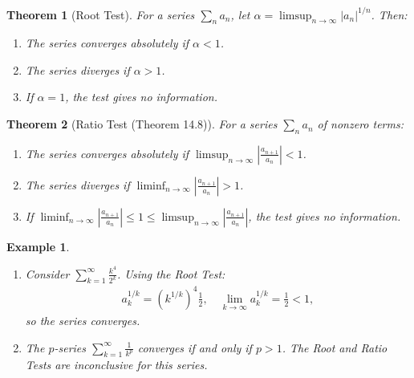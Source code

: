 \documentclass[7pt]{article}
\theoremstyle{definition}
\newtheorem{definition}{Definition}
\theoremstyle{plain}
\newtheorem{theorem}{Theorem}
\newtheorem{example}{Example}
\begin{document}
\begin{theorem}[Root Test]
For a series $ \sum_{n} a_n $, let $ \alpha = \limsup_{n \to \infty} |a_n|^{1/n} $. Then:
\begin{enumerate}
    \item The series converges absolutely if $ \alpha < 1 $.
    \item The series diverges if $ \alpha > 1 $.
    \item If $ \alpha = 1 $, the test gives no information.
\end{enumerate}
\end{theorem}

\begin{theorem}[Ratio Test (Theorem 14.8)]
For a series $ \sum_{n} a_n $ of nonzero terms:
\begin{enumerate}
    \item The series converges absolutely if $ \limsup_{n \to \infty} \left| \frac{a_{n+1}}{a_n} \right| < 1 $.
    \item The series diverges if $ \liminf_{n \to \infty} \left| \frac{a_{n+1}}{a_n} \right| > 1 $.
    \item If $ \liminf_{n \to \infty} \left| \frac{a_{n+1}}{a_n} \right| \leq 1 \leq \limsup_{n \to \infty} \left| \frac{a_{n+1}}{a_n} \right| $, the test gives no information.
\end{enumerate}
\end{theorem}

\begin{example}

\begin{enumerate}
    \item Consider $ \sum_{k=1}^\infty \frac{k^4}{2^k} $. Using the Root Test:
    \begin{align}
    a_k^{1/k} = \left( k^{1/k} \right)^4 \frac{1}{2}, \quad \lim_{k \to \infty} a_k^{1/k} = \frac{1}{2} < 1,
    \end{align}
    so the series converges.
    \item The $ p $-series $ \sum_{k=1}^\infty \frac{1}{k^p} $ converges if and only if $ p > 1 $. The Root and Ratio Tests are inconclusive for this series.
\end{enumerate}
\end{example}

\end{document}
